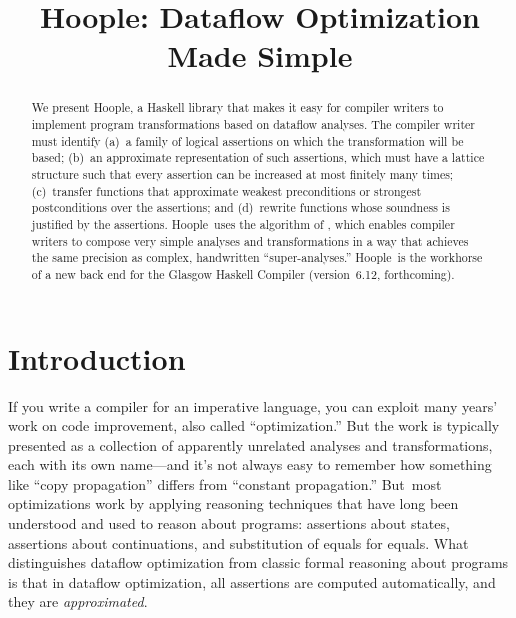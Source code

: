 \documentclass[blockstyle,preprint,natbib,nocopyrightspace]{sigplanconf}
\newcommand\ourlib{Hoople}  %
\def\authornote#1{\unskip\relax}
\newcommand{\simon}[1]{\authornote{SLPJ: #1}}
\begin{document}
\title{\ourlib: Dataflow Optimization Made Simple}



\maketitle
 
\begin{abstract}
We present \ourlib, a Haskell library that makes it easy for compiler writers
to implement program transformations based on dataflow analyses.
The compiler writer must identify (a)~a family of logical assertions
on which the transformation will be based;
(b)~an {approximate}
representation of such assertions, which
must have a lattice structure such that every assertion can be increased at
most finitely many times;
(c)~transfer functions that approximate weakest preconditions or
strongest postconditions over the assertions; and
(d)~rewrite functions whose soundness is justified by the assertions.
\ourlib\ uses the algorithm of 
\citet{lerner-grove-chambers:2002}, which enables compiler writers to
compose very simple analyses and transformations in a way that achieves
the same precision as complex, handwritten
``super-analyses.''
\ourlib\ is the workhorse of a new
back end for the Glasgow Haskell Compiler (version~6.12, forthcoming).
\end{abstract}

\makeatactive  

\section{Introduction}

If you write a compiler for an imperative language, you can exploit
many years' work on code improvement, also called
``optimization.''
But the work is typically presented
as a collection of apparently unrelated analyses and
transformations, each with its own name---and 
it's not always easy to
remember how something like
``copy propagation'' differs from ``constant propagation.''
%
But~most optimizations
work by applying reasoning techniques that have long been understood
and used 
to reason about programs:
assertions about states, assertions about continuations, and
substitution of equals for equals. 
What distinguishes dataflow optimization from classic formal reasoning
about programs is that in dataflow optimization, all assertions are
computed automatically, and they are
\emph{approximated}. 
\end{document}
